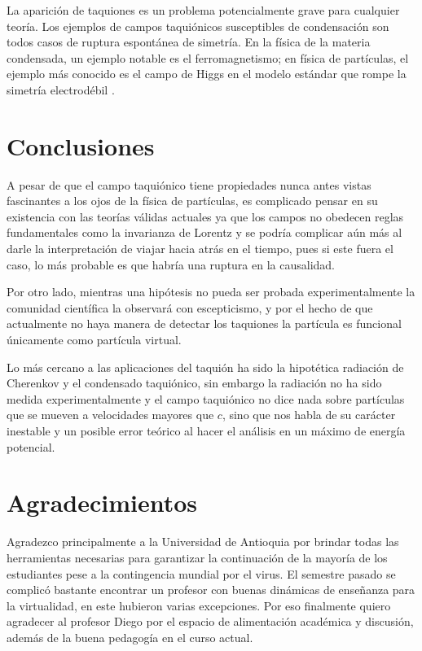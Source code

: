\documentclass[twocolumn,preprintnumbers,amsmath,amssymb]{revtex4}
\begin{document}
La aparición de taquiones es un problema potencialmente grave para cualquier teoría. Los ejemplos de campos taquiónicos susceptibles de condensación son todos casos de ruptura espontánea de simetría. En la física de la materia condensada, un ejemplo notable es el ferromagnetismo; en física de partículas, el ejemplo más conocido es el campo de Higgs en el modelo estándar que rompe la simetría electrodébil \cite{kostelecky1988static}.   


\section{Conclusiones}
A pesar de que el campo taquiónico tiene propiedades nunca antes vistas fascinantes a los ojos de la física de partículas, es complicado pensar en su existencia con las teorías válidas actuales ya que los campos no obedecen reglas fundamentales como la invarianza de Lorentz y se podría complicar aún más al darle la interpretación de viajar hacia atrás en el tiempo, pues si este fuera el caso, lo más probable es que habría una ruptura en la causalidad.  

Por otro lado, mientras una hipótesis no pueda ser probada experimentalmente la comunidad científica la observará con escepticismo, y por el hecho de que actualmente no haya manera de detectar los taquiones la partícula es funcional únicamente como partícula virtual.   

Lo más cercano a las aplicaciones del taquión ha sido la hipotética radiación de Cherenkov y el condensado taquiónico, sin embargo la radiación no ha sido medida experimentalmente y el campo taquiónico no dice nada sobre partículas que se mueven a velocidades mayores que $c$, sino que nos habla de su carácter inestable y un posible error teórico al hacer el análisis en un máximo de energía potencial.   



\section{Agradecimientos}

Agradezco principalmente a la Universidad de Antioquia por brindar todas las herramientas necesarias para garantizar la continuación de la mayoría de los estudiantes pese a la contingencia mundial por el virus.
El semestre pasado se complicó bastante encontrar un profesor con buenas dinámicas de enseñanza para la virtualidad, en este hubieron varias excepciones. Por eso finalmente quiero agradecer al profesor Diego por el espacio de alimentación académica y discusión, además de la buena pedagogía en el curso actual.


\end{document}
